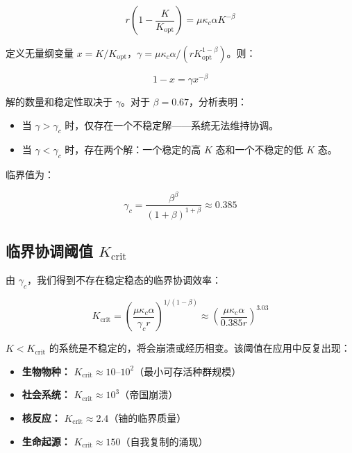 \documentclass[12pt,a4paper]{article}
\theoremstyle{remark}
\newcommand{\Keffopt}{K_{\mathrm{opt}}}
\newcommand{\Keffcrit}{K_{\mathrm{crit}}}
\newcommand{\kappac}{\kappa_c}
\begin{document}
	\begin{equation}
		r \left(1 - \frac{K}{\Keffopt}\right) = \mu \kappac \alpha K^{-\beta}
		\label{eq:stationary}
	\end{equation}
	
	定义无量纲变量 $x = K/\Keffopt$，$\gamma = \mu \kappac \alpha / (r \Keffopt^{1-\beta})$。则：
	
	\begin{equation}
		1 - x = \gamma x^{-\beta}
		\label{eq:dimensionless}
	\end{equation}
	
	解的数量和稳定性取决于 $\gamma$。对于 $\beta = 0.67$，分析表明：
	
	\begin{itemize}
		\item 当 $\gamma > \gamma_c$ 时，仅存在一个不稳定解——系统无法维持协调。
		\item 当 $\gamma < \gamma_c$ 时，存在两个解：一个稳定的高 $K$ 态和一个不稳定的低 $K$ 态。
	\end{itemize}
	
	临界值为：
	
	\begin{equation}
		\gamma_c = \frac{\beta^{\beta}}{(1+\beta)^{1+\beta}} \approx 0.385
		\label{eq:gamma_c}
	\end{equation}
	
	\subsection{临界协调阈值 $\Keffcrit$}
	
	由 $\gamma_c$，我们得到不存在稳定稳态的临界协调效率：
	
	\begin{equation}
		\Keffcrit = \left( \frac{\mu \kappac \alpha}{\gamma_c r} \right)^{1/(1-\beta)} \approx \left( \frac{\mu \kappac \alpha}{0.385 r} \right)^{3.03}
		\label{eq:Kcrit}
	\end{equation}
	
	$K < \Keffcrit$ 的系统是不稳定的，将会崩溃或经历相变。该阈值在应用中反复出现：
	
	\begin{itemize}
		\item \textbf{生物物种：} $\Keffcrit \approx 10$--$10^2$（最小可存活种群规模）
		\item \textbf{社会系统：} $\Keffcrit \approx 10^3$（帝国崩溃）
		\item \textbf{核反应：} $\Keffcrit \approx 2.4$（铀的临界质量）
		\item \textbf{生命起源：} $\Keffcrit \approx 150$（自我复制的涌现）
	\end{itemize}
	
\end{document}
